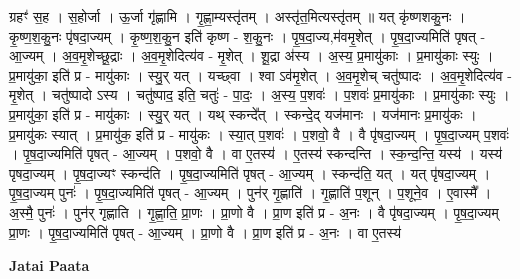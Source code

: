 \documentclass[17pt]{extarticle}
\begin{document}
ग्रहꣳ॑ स॒ह । स॒होर्जा । ऊ॒र्जा गृ॑ह्णामि । गृ॒ह्णा॒म्यस्तृ॑तम् । अस्तृ॑त॒मित्यस्तृ॑तम् ॥ यत् कृ॑ष्णशकु॒नः । कृ॒ष्ण॒श॒कु॒नः पृ॑षदा॒ज्यम् । कृ॒ष्ण॒श॒कु॒न इति॑ कृष्ण - श॒कु॒नः । पृ॒ष॒दा॒ज्य,म॑वमृ॒शेत् । पृ॒ष॒दा॒ज्यमिति॑ पृषत् - आ॒ज्यम् । अ॒व॒मृ॒शेच्छू॒द्राः । अ॒व॒मृ॒शेदित्य॑व - मृ॒शेत् । शू॒द्रा अ॑स्य । अ॒स्य॒ प्र॒मायु॑काः । प्र॒मायु॑काः स्युः । प्र॒मायु॑का॒ इति॑ प्र - मायु॑काः । स्यु॒र् यत् । यच्छ्वा । श्वा ऽव॑मृ॒शेत् । अ॒व॒मृ॒शेच् चतु॑ष्पादः । अ॒व॒मृ॒शेदित्य॑व - मृ॒शेत् । चतु॑ष्पादो ऽस्य । चतु॑ष्पाद॒ इति॒ चतुः॑ - पा॒दः॒ । अ॒स्य॒ प॒शवः॑ । प॒शवः॑ प्र॒मायु॑काः । प्र॒मायु॑काः स्युः । प्र॒मायु॑का॒ इति॑ प्र - मायु॑काः । स्यु॒र् यत् । यथ् स्कन्दे᳚त् । स्कन्दे॒द् यज॑मानः । यज॑मानः प्र॒मायु॑कः । प्र॒मायु॑कः स्यात् । प्र॒मायु॑क॒ इति॑ प्र - मायु॑कः । स्या॒त् प॒शवः॑ । प॒शवो॒ वै । वै पृ॑षदा॒ज्यम् । पृ॒ष॒दा॒ज्यम् प॒शवः॑ । पृ॒ष॒दा॒ज्यमिति॑ पृषत् - आ॒ज्यम् । प॒शवो॒ वै । वा ए॒तस्य॑ । ए॒तस्य॑ स्कन्दन्ति । स्क॒न्द॒न्ति॒ यस्य॑ । यस्य॑ पृषदा॒ज्यम् । पृ॒ष॒दा॒ज्यꣳ स्कन्द॑ति । पृ॒ष॒दा॒ज्यमिति॑ पृषत् - आ॒ज्यम् । स्कन्द॑ति॒ यत् । यत् पृ॑षदा॒ज्यम् । पृ॒ष॒दा॒ज्यम् पुनः॑ । पृ॒ष॒दा॒ज्यमिति॑ पृषत् - आ॒ज्यम् । पुन॑र् गृ॒ह्णाति॑ । गृ॒ह्णाति॑ प॒शून् । प॒शूने॒व । ए॒वास्मै᳚ । अ॒स्मै॒ पुनः॑ । पुन॑र् गृह्णाति । गृ॒ह्णा॒ति॒ प्रा॒णः । प्रा॒णो वै । प्रा॒ण इति॑ प्र - अ॒नः । वै पृ॑षदा॒ज्यम् । पृ॒ष॒दा॒ज्यम् प्रा॒णः । पृ॒ष॒दा॒ज्यमिति॑ पृषत् - आ॒ज्यम् । प्रा॒णो वै । प्रा॒ण इति॑ प्र - अ॒नः । वा ए॒तस्य॑ \newline

\textbf{Jatai Paata} \newline
\end{document}
